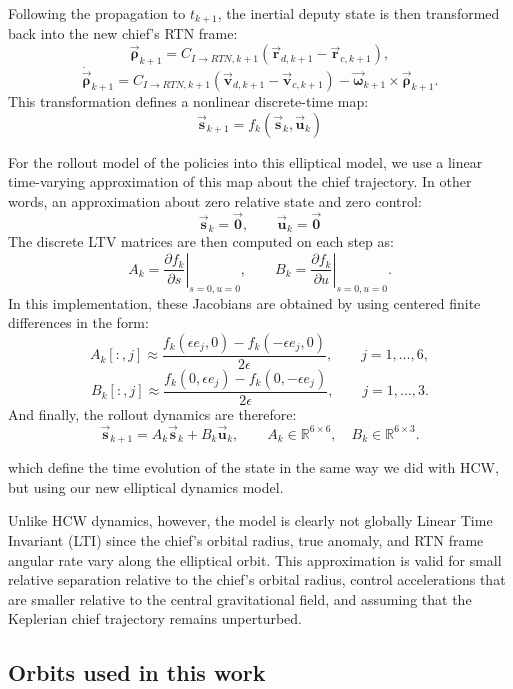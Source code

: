 Following the propagation to $t_{k+1}$, the inertial deputy state is then transformed back into the new chief's RTN frame:
\[
\vec{\boldsymbol{\rho}}_{k+1}
=
C_{I\to RTN,k+1}
\left(
\vec{\boldsymbol{r}}_{d,k+1}-\vec{\boldsymbol{r}}_{c,k+1}
\right),
\]
\[
\dot{\vec{\boldsymbol{\rho}}}_{k+1}
=
C_{I\to RTN,k+1}
\left(
\vec{\boldsymbol{v}}_{d,k+1}-\vec{\boldsymbol{v}}_{c,k+1}
\right)
-
\vec{\boldsymbol{\omega}}_{k+1}\times \vec{\boldsymbol{\rho}}_{k+1}.
\]
This transformation defines a nonlinear discrete-time map:
\[
\vec{\mathbf{s}}_{k+1} = f_k(\vec{\mathbf{s}}_k, \vec{\mathbf{u}}_k)
\]


For the rollout model of the policies into this elliptical model, we use a linear time-varying approximation of this map about the chief trajectory. In other words, an approximation about zero relative state and zero control:
\[
\vec{\mathbf{s}}_k = \vec{\mathbf{0}},
\qquad
\vec{\mathbf{u}}_k = \vec{\mathbf{0}}
\]
The discrete LTV matrices are then computed on each step as:
\[
A_k
=
\left.
\frac{\partial f_k}{\partial s}
\right|_{s=0,u=0},
\qquad
B_k
=
\left.
\frac{\partial f_k}{\partial u}
\right|_{s=0,u=0}.
\]
In this implementation, these Jacobians are obtained by using centered finite differences in the form:
\[
A_k[:,j]
\approx
\frac{
f_k(\epsilon e_j,0) - f_k(-\epsilon e_j,0)
}{2\epsilon},
\qquad
j=1,\ldots,6,
\]
\[
B_k[:,j]
\approx
\frac{
f_k(0,\epsilon e_j) - f_k(0,-\epsilon e_j)
}{2\epsilon},
\qquad
j=1,\ldots,3.
\]
And finally, the rollout dynamics are therefore:
\[
\vec{\mathbf{s}}_{k+1} = A_k\vec{\mathbf{s}}_k + B_k\vec{\mathbf{u}}_k,
\qquad
A_k \in \mathbb{R}^{6\times 6},
\quad
B_k \in \mathbb{R}^{6\times 3}.
\]

which define the time evolution of the state in the same way we did with HCW, but using our new elliptical dynamics model.

Unlike HCW dynamics, however, the model is clearly not globally Linear Time Invariant (LTI) since the chief's orbital radius, true anomaly, and RTN frame angular rate vary along the elliptical orbit. This approximation is valid for small relative separation relative to the chief's orbital radius, control accelerations that are smaller relative to the central gravitational field, and assuming that the Keplerian chief trajectory remains unperturbed.

\subsection{Orbits used in this work}


